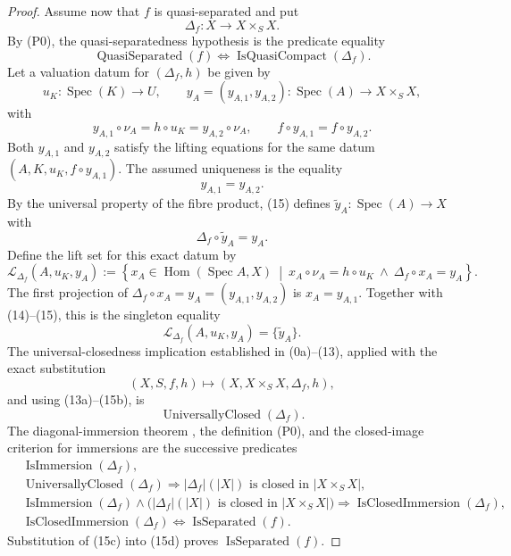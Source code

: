 \begin{proof}
  Assume now that $f$ is quasi-separated and put
  \[
    \Delta_f\colon X\to X\times_SX.
  \]
  By (P0), the quasi-separatedness hypothesis is the predicate equality
  \[
    \operatorname{QuasiSeparated}(f)
      \Longleftrightarrow\operatorname{IsQuasiCompact}(\Delta_f). \tag{13a}
  \]
  Let a valuation datum for
  $(\Delta_f,h)$ be given by
  \[
    u_K\colon\operatorname{Spec}(K)\to U,
    \qquad
    y_A=(y_{A,1},y_{A,2})\colon
      \operatorname{Spec}(A)\to X\times_SX,
  \]
  with
  \[
    y_{A,1}\circ\nu_A=h\circ u_K
      =y_{A,2}\circ\nu_A,
    \qquad
    f\circ y_{A,1}=f\circ y_{A,2}.                               \tag{14}
  \]
  Both $y_{A,1}$ and $y_{A,2}$ satisfy the lifting equations for the same
  datum $(A,K,u_K,f\circ y_{A,1})$.  The assumed uniqueness is the equality
  \[
    y_{A,1}=y_{A,2}.                                               \tag{15}
  \]
  By the universal property of the fibre product, (15) defines
  $\widetilde y_A\colon\operatorname{Spec}(A)\to X$ with
  \[
    \Delta_f\circ\widetilde y_A=y_A.
  \]
  Define the lift set for this exact datum by
  \[
    \mathscr L_{\Delta_f}(A,u_K,y_A):=
      \left\{x_A\in\operatorname{Hom}(\operatorname{Spec}A,X)
      \ \middle|\ 
      x_A\circ\nu_A=h\circ u_K\ \wedge\
      \Delta_f\circ x_A=y_A\right\}.                           \tag{15a}
  \]
  The first projection of
  $\Delta_f\circ x_A=y_A=(y_{A,1},y_{A,2})$ is $x_A=y_{A,1}$.
  Together with (14)--(15), this is the singleton equality
  \[
    \mathscr L_{\Delta_f}(A,u_K,y_A)=\{\widetilde y_A\}.         \tag{15b}
  \]
  The universal-closedness implication established in (0a)--(13), applied
  with the exact substitution
  \[
    (X,S,f,h)\longmapsto(X,X\times_SX,\Delta_f,h),
  \]
  and using (13a)--(15b), is
  \[
    \operatorname{UniversallyClosed}(\Delta_f).                 \tag{15c}
  \]
  The diagonal-immersion theorem
  \cite[\href{https://stacks.math.columbia.edu/tag/01KJ}{Tag 01KJ}]
  {stacks-project}, the definition (P0), and the closed-image criterion for
  immersions
  \cite[\href{https://stacks.math.columbia.edu/tag/01IQ}{Tag 01IQ}]
  {stacks-project} are the successive predicates
  \[
  \begin{aligned}
    &\operatorname{IsImmersion}(\Delta_f),\\
    &\operatorname{UniversallyClosed}(\Delta_f)
      \Longrightarrow
      |\Delta_f|(|X|)\text{ is closed in }|X\times_SX|,\\
    &\operatorname{IsImmersion}(\Delta_f)
      \wedge\bigl(|\Delta_f|(|X|)\text{ is closed in }|X\times_SX|\bigr)
      \Longrightarrow\operatorname{IsClosedImmersion}(\Delta_f),\\
    &\operatorname{IsClosedImmersion}(\Delta_f)
      \Longleftrightarrow\operatorname{IsSeparated}(f).
  \end{aligned}                                                   \tag{15d}
  \]
  Substitution of (15c) into (15d) proves
  $\operatorname{IsSeparated}(f)$.
\end{proof}
